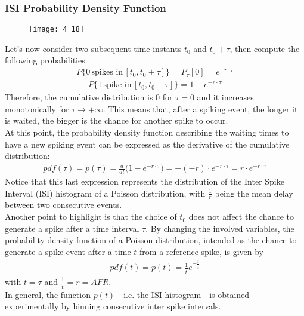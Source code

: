 \subsubsection{ISI Probability Density Function}
\begin{figure}[H]
    \texttt{[image: 4\_18]}
    \centering
\end{figure}
Let's now consider two subsequent time instants \(t_0\) and \(t_0+\tau\), then compute
the following probabilities:
\begin{align*}
    P\{0\,\text{spikes in}\,[t_0,t_0+\tau]\} = P_{\tau}[0] = e^{-r\cdot\tau}
\end{align*}
\begin{align*}
    P\{1\,\text{spike in}\,[t_0,t_0+\tau]\}
    = 1-e^{-r\cdot\tau}
\end{align*}
Therefore, the cumulative distribution is 0 for \(\tau=0\) and it increases
monotonically for \(\tau\to{+\infty}\). This means that, after a spiking event,
the longer it is waited, the bigger is the chance for another spike to occur.\\
At this point, the probability density function describing the waiting times to
have a new spiking event can be expressed as the derivative of the cumulative
distribution:
\begin{align*}
    pdf(\tau)
    =p(\tau)
    =\frac{d}{dt}\bigl(1-e^{-r\cdot\tau}\bigr)
    =-(-r)\cdot{e^{-r\cdot\tau}}
    =r\cdot{e^{-r\cdot\tau}}
\end{align*}
Notice that this last expression represents the distribution of the Inter Spike
Interval (ISI) histogram of a Poisson distribution, with \(\frac{1}{r}\) being
the mean delay between two consecutive events.\\
Another point to highlight is that the choice of \(t_0\) does not affect the chance
to generate a spike after a time interval \(\tau\).
By changing the involved variables, the probability density function of a
Poisson distribution, intended as the chance to generate a spike event after a time
\(t\) from a reference spike, is given by
\begin{align*}
    pdf(t)
    =p(t)
    =\frac{1}{\overline{t}}e^{-\frac{t}{\overline{t}}}
\end{align*}
with \(t=\tau\) and \(\frac{1}{\overline{t}}=r=AFR\).\\
In general, the function \(p(t)\) - i.e. the ISI histogram - is obtained
experimentally by binning consecutive inter spike intervals.



